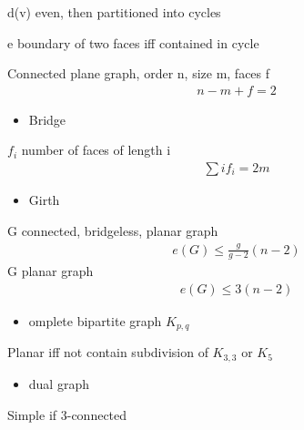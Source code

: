 \begin{lemma}
    d(v) even, then partitioned into cycles
\end{lemma}

\begin{lemma}
    e boundary of two faces iff contained in cycle
\end{lemma}

\begin{thm}[Euler]
    Connected plane graph, order n, size m, faces f
    \begin{align*}
        n - m + f = 2
    \end{align*}
\end{thm}

\begin{itemize}
    \item Bridge
\end{itemize}
%
\begin{fact}
    $f_i$ number of faces of length i
    \begin{align*}
        \sum i f_i = 2m
    \end{align*}
\end{fact}

\begin{itemize}
    \item Girth
\end{itemize}

\begin{thm}
    G connected, bridgeless, planar graph
    \begin{align*}
        e(G) \leq \frac{g}{g-2}(n-2)
    \end{align*}
    G planar graph
    \begin{align*}
        e(G) \leq 3(n -2)
    \end{align*}
\end{thm}

\begin{itemize}
    \item omplete bipartite graph $K_{p,q}$
\end{itemize}

\begin{thm}[Kuratowski]
    Planar iff not contain subdivision of $K_{3,3}$ or $K_5$
\end{thm}

\begin{itemize}
    \item dual graph
\end{itemize}

\begin{fact}
    Simple if 3-connected
\end{fact}